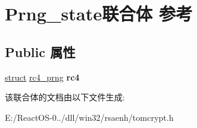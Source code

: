 \hypertarget{union_prng__state}{}\section{Prng\+\_\+state联合体 参考}
\label{union_prng__state}
\subsection*{Public 属性}
\begin{DoxyCompactItemize}
\item 
\mbox{\label{union_prng__state_ac7c431656f544a36586b09fc5117bf02}} 
\hyperlink{interfacestruct}{struct} \hyperlink{structrc4__prng}{rc4\+\_\+prng} {\bfseries rc4}
\end{DoxyCompactItemize}


该联合体的文档由以下文件生成\+:\begin{DoxyCompactItemize}
\item 
E\+:/\+React\+O\+S-\/0../dll/win32/rsaenh/tomcrypt.\+h\end{DoxyCompactItemize}
